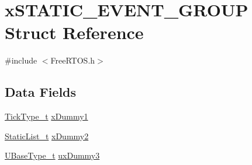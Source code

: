 \hypertarget{structxSTATIC__EVENT__GROUP}{\section{x\-S\-T\-A\-T\-I\-C\-\_\-\-E\-V\-E\-N\-T\-\_\-\-G\-R\-O\-U\-P Struct Reference}
\label{structxSTATIC__EVENT__GROUP}
}


{\ttfamily \#include $<$Free\-R\-T\-O\-S.\-h$>$}

\subsection*{Data Fields}
\begin{DoxyCompactItemize}
\item 
\hyperlink{Flsh186_2prtmacro_8h_aa69c48c6e902ce54f70886e6573c92a9}{Tick\-Type\-\_\-t} \hyperlink{structxSTATIC__EVENT__GROUP_a4ed0094f715dd8f79a354f42fd973fc6}{x\-Dummy1}
\item 
\hyperlink{FreeRTOS_8h_a9735ad9101a2bd25f83a62089a4acee6}{Static\-List\-\_\-t} \hyperlink{structxSTATIC__EVENT__GROUP_a17d070c972ecd0151d7505a539653551}{x\-Dummy2}
\item 
\hyperlink{Flsh186_2prtmacro_8h_a8e88a5e44a5243b3d1c29af17fd6b5bd}{U\-Base\-Type\-\_\-t} \hyperlink{structxSTATIC__EVENT__GROUP_ac059ee9daf2007d76e5a576ac159ebb6}{ux\-Dummy3}
\end{DoxyCompactItemize}


